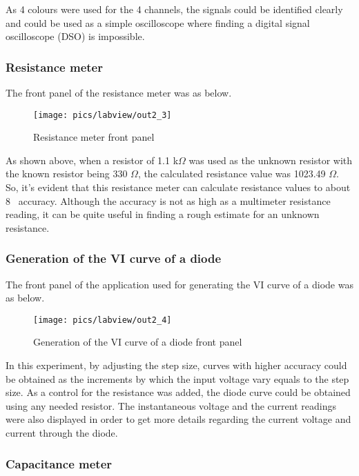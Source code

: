 \noindent
As 4 colours were used for the 4 channels, the signals could be identified clearly and could be used as a simple oscilloscope  where finding a digital signal oscilloscope (DSO) is impossible.

\subsubsection{Resistance meter}

\noindent
The front panel of the resistance meter was as below.

\begin{figure}[!h]
	\centering
	\texttt{[image: pics/labview/out2\_3]}
	\caption{Resistance meter front panel}
	\label{fig:out21}
\end{figure}

\noindent
As shown above, when a resistor of 1.1 k$ \Omega $ was used as the unknown resistor with the known resistor being 330 $ \Omega $, the calculated resistance value was 1023.49 $ \Omega $. So, it's evident that this resistance meter can calculate resistance values to about 8 \textdiscount\  accuracy. Although the accuracy is not as high as a multimeter resistance reading, it can be quite useful in finding a rough estimate for an unknown resistance.

\subsubsection{Generation of the VI curve of a diode}

\noindent
The front panel of the application used for generating the VI curve of a diode  was as below.

\begin{figure}[!h]
	\centering
	\texttt{[image: pics/labview/out2\_4]}
	\caption{Generation of the VI curve of a diode front panel}
	\label{fig:out24}
\end{figure}

\noindent
In this experiment, by adjusting the step size, curves with higher accuracy could be obtained as the increments by which the input voltage vary equals to the step size. As a control for the resistance was added, the diode curve could be obtained using any needed resistor. The instantaneous voltage and the current readings were also displayed in order to get more details regarding the current voltage and current through the diode.

\subsubsection{Capacitance meter}

